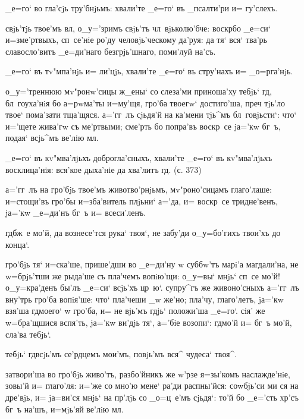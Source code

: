 {{  _е=го` во гла'сjь тру'бнjьмъ: 
хвали'те _е=го` въ _псалти'ри и= гу'слехъ.

 свjь'тjь твое'мъ вл, о_у='зримъ свjь'тъ 
чл~вjьколю'бче: воскр бо _е=си` и=з\ъ ме'ртвыхъ, 
сп~се'нiе ро'ду человjь'ческому да'руя: да тя` вся` 
тва'рь славосло'витъ _е=ди'наго безгрjь'шнаго, поми'луй 
на'съ.


  _е=го` въ тv"мпа'нjь и= ли'цjь, 
хвали'те _е=го` въ стру'нахъ и= _о=рга'нjь.

 о_у='треннюю мv"ронw'сицы ж_ены` со 
слеза'ми приноша'ху тебjь` гд, бл~гоуха'нiя бо 
а=рwма'ты и=му'щя, гро'ба твоегw` достиго'ша, преч 
тjь'ло твое` пома'зати тща'щяся. а='гг~лъ сjьдя'й на 
ка'мени тjь^мъ бл~говjьсти`: что` и='щете жива'гw съ 
ме'ртвыми; сме'рть бо попра'въ воскр~се jа='кw бг~ъ, 
подая` всjь^мъ ве'лiю мл.

  _е=го` въ кv"мва'лjьхъ 
доброгла'сныхъ, хвали'те _е=го` въ кv"мва'лjьхъ 
восклица'нiя: вся'кое дыха'нiе да хва'литъ гд. (с. 
373)

 а='гг~лъ на гро'бjь твое'мъ 
животво'рнjьмъ, мv"роно'сицамъ глаго'лаше: и=стощи'въ 
гро'бы и=зба'витель плjьни` а='да, и= воскр~се 
тридне'венъ, jа='кw _е=ди'нъ бг~ъ и= всеси'ленъ.

  гд бж~е мо'й, да вознесе'тся 
рука` твоя`, не забу'ди о_у=бо'гихъ твои'хъ до конца`.

 гро'бjь тя` и=ска'ше, прише'дши во _е=ди'ну w\т 
суббw'тъ марi'а магдали'на, не w=брjь'тши же рыда'ше съ 
пла'чемъ вопiю'щи: о_у=вы` мнjь` сп~се мо'й! о_у=кра'денъ 
бы'лъ _е=си` всjь'хъ цр~ю`. супру^гъ же живоно'сныхъ 
а='гг~лъ вну'трь гро'ба вопiя'ше: что` пла'чеши _w же'но; 
пла'чу, глаго'летъ, jа='кw взя'ша гд моего` w\т 
гро'ба, и= не вjь'мъ гдjь` положи'ша _е=го`. сiя' же 
w=бра'щшися вспя'ть, jа='кw ви'дjь тя`, а='бiе возопи`: 
гд мо'й и= бг~ъ мо'й, сла'ва тебjь`.

  тебjь` гд всjь'мъ 
се'рдцемъ мои'мъ, повjь'мъ вся^ чудеса` твоя^.

 затвори'ша во гро'бjь живо'тъ, 
разбо'йникъ же w'рзе я=зы'комъ наслажде'нiе, зовы'й 
и= глаго'ля: и='же со мно'ю мене` ра'ди распны'йся: 
соwбjь'си ми ся на дре'вjь, и= jа=ви'ся мнjь` на 
пр'лjь со _о=ц~е'мъ сjьдя`: то'й бо _е='сть хр'съ 
бг~ъ на'шъ, и=мjь'яй ве'лiю мл.

}}
